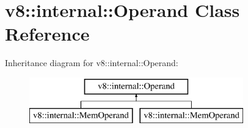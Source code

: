 \hypertarget{classv8_1_1internal_1_1_operand}{}\section{v8\+:\+:internal\+:\+:Operand Class Reference}
\label{classv8_1_1internal_1_1_operand}
Inheritance diagram for v8\+:\+:internal\+:\+:Operand\+:\begin{figure}[H]
\begin{center}
\leavevmode
\includegraphics[height=2.000000cm]{classv8_1_1internal_1_1_operand}
\end{center}
\end{figure}
